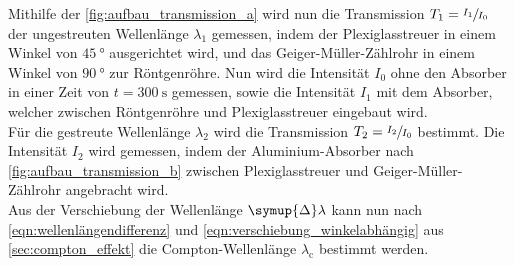     Mithilfe der \autoref{fig:aufbau_transmission_a} wird nun die Transmission $T_1 = \sfrac{I_1}{I_0}$ der ungestreuten Wellenlänge $\lambda_1$ gemessen,
    indem der Plexiglasstreuer in einem Winkel von $\SI{45}{\degree}$ ausgerichtet wird,
    und das Geiger-Müller-Zählrohr in einem Winkel von $\SI{90}{\degree}$ zur Röntgenröhre.
    Nun wird die Intensität $I_0$ ohne den Absorber in einer Zeit von $t = \SI{300}{\second}$ gemessen,
    sowie die Intensität $I_1$ mit dem Absorber,
    welcher zwischen Röntgenröhre und Plexiglasstreuer eingebaut wird.\\
    Für die gestreute Wellenlänge $\lambda_2$ wird die Transmission $T_2 = \sfrac{I_2}{I_0}$ bestimmt.
    Die Intensität $I_2$ wird gemessen,
    indem der Aluminium-Absorber nach \autoref{fig:aufbau_transmission_b}
    zwischen Plexiglasstreuer und Geiger-Müller-Zählrohr angebracht wird.\\
    Aus der Verschiebung der Wellenlänge $\symup{\Delta}\lambda$ kann nun
    nach \eqref{eqn:wellenlängendifferenz} und \eqref{eqn:verschiebung_winkelabhängig}
    aus \autoref{sec:compton_effekt} die Compton-Wellenlänge $\lambda_\text{c}$ bestimmt werden.
